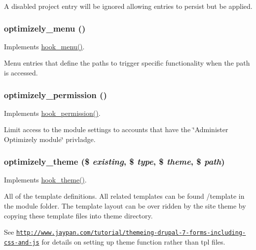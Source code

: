 A disabled project entry will be ignored allowing entries to persist but be applied. \hypertarget{optimizely_8module_a7411f84b7853003b0d2f0194ae41a0df}{
\subsubsection[{optimizely\_\-menu}]{\setlength{\rightskip}{0pt plus 5cm}optimizely\_\-menu ()}}
\label{optimizely_8module_a7411f84b7853003b0d2f0194ae41a0df}
Implements \hyperlink{group__hooks_ga5c95244fea59b25666e409759e133ded}{hook\_\-menu()}.

Menu entries that define the paths to trigger specific functionality when the path is accessed. \hypertarget{optimizely_8module_ae89dab888e84b13295533fcbc7117183}{
\subsubsection[{optimizely\_\-permission}]{\setlength{\rightskip}{0pt plus 5cm}optimizely\_\-permission ()}}
\label{optimizely_8module_ae89dab888e84b13295533fcbc7117183}
Implements \hyperlink{group__hooks_ga2b22b45f4925f2478412477bae329713}{hook\_\-permission()}.

Limit access to the module settings to accounts that have the \char`\"{}Administer Optimizely module\char`\"{} privladge. \hypertarget{optimizely_8module_ae230656a97c5bda735c774bad1380d77}{
\subsubsection[{optimizely\_\-theme}]{\setlength{\rightskip}{0pt plus 5cm}optimizely\_\-theme (\$ {\em existing}, \/  \$ {\em type}, \/  \$ {\em theme}, \/  \$ {\em path})}}
\label{optimizely_8module_ae230656a97c5bda735c774bad1380d77}
Implements \hyperlink{group__hooks_ga013ccb45c7aaab1c16cf9691428c910d}{hook\_\-theme()}.

All of the template definitions. All related templates can be found /template in the module folder. The template layout can be over ridden by the site theme by copying these template files into theme directory.

See \href{http://www.jaypan.com/tutorial/themeing-drupal-7-forms-including-css-and-js}{\tt http://www.jaypan.com/tutorial/themeing-\/drupal-\/7-\/forms-\/including-\/css-\/and-\/js} for details on setting up theme function rather than tpl files. 
